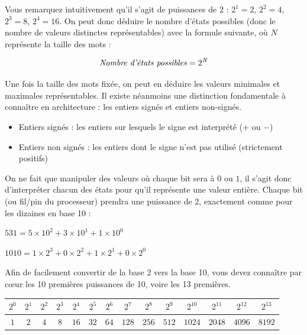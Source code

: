 \documentclass[11pt,a4paper]{article}
\begin{document}
Vous remarquez intuitivement qu'il s'agit de puissances de $ 2 $ : $ 2^1 = 2 $, $ 2^2 = 4 $, $ 2^3 = 8 $, $ 2^4 = 16 $.
On peut donc déduire le nombre d'états possibles (donc le nombre de valeurs distinctes représentables) avec la formule suivante, où $ N $ représente la taille des mots :

\begin{equation*}
\text{\textit{Nombre d'états possibles}} = 2^{\text{\textit{N}}}
\label{equation:1-Taille-Mots}
\end{equation*}

\bigskip

Une fois la taille des mots fixée, on peut en déduire les valeurs minimales et maximales représentables.
Il existe néanmoins une distinction fondamentale à connaître en architecture : les entiers signés et entiers non-signés.

\begin{itemize}
\item Entiers signés : les entiers sur lesquels le signe est interprété ($ + $ ou $ - $)
\item Entiers non signés : les entiers dont le signe n'est pas utilisé (strictement positifs)
\end{itemize}

On ne fait que manipuler des valeurs où chaque bit sera à $ 0 $ ou $ 1 $, il s'agit donc d'interpréter chacun des états pour qu'il représente une valeur entière.
Chaque \og bit \fg{} (ou fil/pin du processeur) prendra une puissance de $ 2 $, exactement comme pour les dizaines en base 10 :

\medskip

$ 531 =  5 \times 10^2 + 3 \times 10^1 + 1 \times 10^0 $

\smallskip

$ 1010 = 1 \times 2^3 + 0 \times 2^2 + 1 \times 2^1 + 0 \times 2^0 $

\bigskip

Afin de facilement convertir de la base 2 vers la base 10, vous devez connaître par cœur les 10 premières puissances de 10, voire les 13 premières.

\bigskip

\begin{center}
\begin{tabular}{ | c | c c c c c | c c c c c | c c c |}
\hline
$ 2^0 $   &   $ 2^1 $ & $ 2^2 $ & $ 2^3 $ & $ 2^4 $ & $ 2^5 $   &   $ 2^6 $ & $ 2^7 $ & $ 2^8 $ & $ 2^9 $ & $ 2^{10} $   &   $ 2^{11} $ & $ 2^{12} $ & $ 2^{13} $ \\
\hline
$   1 $   &   $   2 $ & $   4 $ & $   8 $ & $  16 $ & $  32 $   &   $  64 $ & $ 128 $ & $ 256 $ & $ 512 $ & $   1024 $   &   $   2048 $ & $   4096 $ & $   8192 $ \\
\hline
\end{tabular}
\end{center}
\end{document}
